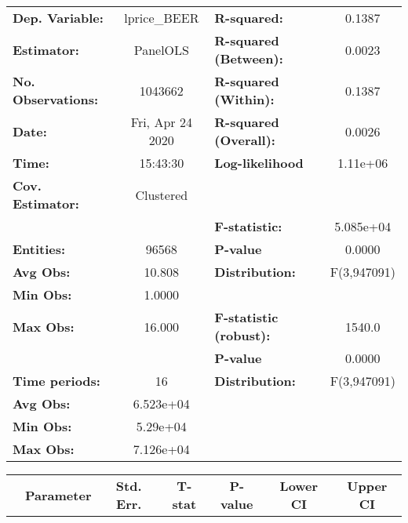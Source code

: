 \documentclass{report}
\begin{document}
\begin{center}
\begin{tabular}{lclc}
\toprule
\textbf{Dep. Variable:}    &    lprice\_BEER    & \textbf{  R-squared:         }   &      0.1387      \\
\textbf{Estimator:}        &      PanelOLS      & \textbf{  R-squared (Between):}  &      0.0023      \\
\textbf{No. Observations:} &      1043662       & \textbf{  R-squared (Within):}   &      0.1387      \\
\textbf{Date:}             &  Fri, Apr 24 2020  & \textbf{  R-squared (Overall):}  &      0.0026      \\
\textbf{Time:}             &      15:43:30      & \textbf{  Log-likelihood     }   &     1.11e+06     \\
\textbf{Cov. Estimator:}   &     Clustered      & \textbf{                     }   &                  \\
\textbf{}                  &                    & \textbf{  F-statistic:       }   &    5.085e+04     \\
\textbf{Entities:}         &       96568        & \textbf{  P-value            }   &      0.0000      \\
\textbf{Avg Obs:}          &       10.808       & \textbf{  Distribution:      }   &   F(3,947091)    \\
\textbf{Min Obs:}          &       1.0000       & \textbf{                     }   &                  \\
\textbf{Max Obs:}          &       16.000       & \textbf{  F-statistic (robust):} &      1540.0      \\
\textbf{}                  &                    & \textbf{  P-value            }   &      0.0000      \\
\textbf{Time periods:}     &         16         & \textbf{  Distribution:      }   &   F(3,947091)    \\
\textbf{Avg Obs:}          &     6.523e+04      & \textbf{                     }   &                  \\
\textbf{Min Obs:}          &      5.29e+04      & \textbf{                     }   &                  \\
\textbf{Max Obs:}          &     7.126e+04      & \textbf{                     }   &                  \\
\bottomrule
\end{tabular}
\begin{tabular}{lcccccc}
                           & \textbf{Parameter} & \textbf{Std. Err.} & \textbf{T-stat} & \textbf{P-value} & \textbf{Lower CI} & \textbf{Upper CI}  \\

\end{tabular}
\end{center}
\end{document}
